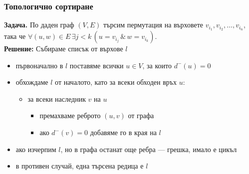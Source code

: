 \documentclass{beamer}
\begin{document}
\begin{frame}
  \frametitle{Топологично сортиране}
  \textbf{Задача. }По даден граф $(V,E)$ търсим пермутация на върховете $v_{i_1},v_{i_2},\ldots,v_{i_n}$, така че $\forall (u,w)\in E\,\exists j < k\,(u = v_{i_j}\,\&\,w = v_{i_k})$.\\
  \pause
  \textbf{Решение: }Събираме списък от върхове $l$\\
  \begin{itemize}[<+->]
  \item първоначално в $l$ поставяме всички $u\in V$, за които $d^-(u) = 0$
  \item обхождаме $l$ от началото, като за всеки обходен връх $u$:
    \begin{itemize}
    \item за всеки наследник $v$ на $u$
      \begin{itemize}
      \item премахваме реброто $(u,v)$ от графа
      \item ако $d^-(v) = 0$ добавяме го в края на $l$
      \end{itemize}
    \end{itemize}
  \item ако изчерпим $l$, но в графа останат още ребра --- грешка, имало е цикъл
  \item в противен случай, една търсена редица е $l$
  \end{itemize}
\end{frame}
\end{document}
